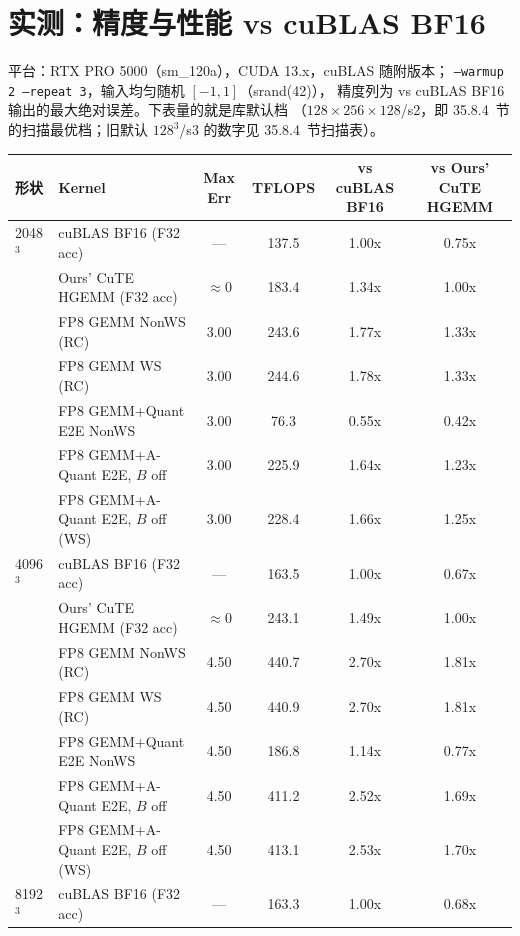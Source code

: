 \section{实测：精度与性能 vs cuBLAS BF16}\label{sec:35-perf}

平台：RTX PRO 5000（sm\_120a），CUDA 13.x，cuBLAS 随附版本；
\texttt{--warmup 2 --repeat 3}，输入均匀随机 $[-1,1]$（srand(42)），
精度列为 vs cuBLAS BF16 输出的最大绝对误差。下表量的就是库默认档
（$128\times256\times128$/s2，即 35.8.4~节的扫描最优档；旧默认
$128^3$/s3 的数字见 35.8.4~节扫描表）。

\begin{center}
\scriptsize
\begin{tabular}{llcccc}
\toprule
形状 & Kernel & Max Err & TFLOPS & vs cuBLAS BF16 & vs Ours' CuTE HGEMM \\
\midrule
2048$^3$ & cuBLAS BF16 (F32 acc)       & ---   & 137.5 & 1.00x & 0.75x \\
          & Ours' CuTE HGEMM (F32 acc)  & $\approx$0 & 183.4 & 1.34x & 1.00x \\
          & FP8 GEMM NonWS (RC)         & 3.00  & 243.6 & 1.77x & 1.33x \\
          & FP8 GEMM WS (RC)            & 3.00  & 244.6 & 1.78x & 1.33x \\
          & FP8 GEMM+Quant E2E NonWS    & 3.00  &  76.3 & 0.55x & 0.42x \\
          & FP8 GEMM+A-Quant E2E, $B$ off & 3.00 & 225.9 & 1.64x & 1.23x \\
          & FP8 GEMM+A-Quant E2E, $B$ off (WS) & 3.00 & 228.4 & 1.66x & 1.25x \\
\midrule
4096$^3$ & cuBLAS BF16 (F32 acc)       & ---   & 163.5 & 1.00x & 0.67x \\
          & Ours' CuTE HGEMM (F32 acc)  & $\approx$0 & 243.1 & 1.49x & 1.00x \\
          & FP8 GEMM NonWS (RC)         & 4.50  & 440.7 & 2.70x & 1.81x \\
          & FP8 GEMM WS (RC)            & 4.50  & 440.9 & 2.70x & 1.81x \\
          & FP8 GEMM+Quant E2E NonWS    & 4.50  & 186.8 & 1.14x & 0.77x \\
          & FP8 GEMM+A-Quant E2E, $B$ off & 4.50 & 411.2 & 2.52x & 1.69x \\
          & FP8 GEMM+A-Quant E2E, $B$ off (WS) & 4.50 & 413.1 & 2.53x & 1.70x \\
\midrule
8192$^3$ & cuBLAS BF16 (F32 acc)       & ---   & 163.3 & 1.00x & 0.68x \\

\end{tabular}
\end{center}
